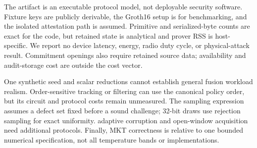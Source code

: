 The artifact is an executable protocol model, not deployable security software.
Fixture keys are publicly derivable, the Groth16 setup is for benchmarking, and
the isolated attestation path is assumed. Primitive and serialized-byte counts
are exact for the code, but retained state is analytical and prover RSS is
host-specific. We report no device latency, energy, radio duty cycle, or
physical-attack result. Commitment openings also require retained source data;
availability and audit-storage cost are outside the cost vector.

One synthetic seed and scalar reductions cannot establish general fusion
workload realism. Order-sensitive tracking or filtering can use the
canonical policy order, but its circuit and protocol costs remain unmeasured.
The sampling expression assumes a defect set fixed before a sound challenge;
32-bit draws use rejection sampling for exact uniformity.
adaptive corruption and open-window acquisition need additional protocols.
Finally, MKT correctness is relative to one bounded numerical specification,
not all temperature bands or implementations.
